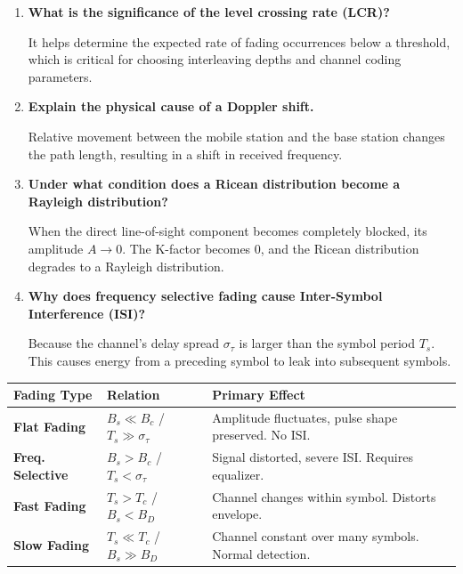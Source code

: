 \documentclass[12pt,a4paper]{article}
\newcommand{\Q}[1]{\textbf{#1}\par\noindent\ignorespaces}
\renewcommand{\arraystretch}{1.45}
\begin{document}
\begin{tcolorbox}[exambox, title={\textbf{Frequently Asked / Viva Questions}}]
\begin{enumerate}[topsep=0pt, label=\textbf{Q\arabic*.}, itemsep=5pt]
  \item \Q{What is the significance of the level crossing rate (LCR)?}
    It helps determine the expected rate of fading occurrences below a threshold, which is critical for choosing interleaving depths and channel coding parameters.
  \item \Q{Explain the physical cause of a Doppler shift.}
    Relative movement between the mobile station and the base station changes the path length, resulting in a shift in received frequency.
  \item \Q{Under what condition does a Ricean distribution become a Rayleigh distribution?}
    When the direct line-of-sight component becomes completely blocked, its amplitude $A \to 0$. The K-factor becomes 0, and the Ricean distribution degrades to a Rayleigh distribution.
  \item \Q{Why does frequency selective fading cause Inter-Symbol Interference (ISI)?}
    Because the channel's delay spread $\sigma_\tau$ is larger than the symbol period $T_s$. This causes energy from a preceding symbol to leak into subsequent symbols.
\end{enumerate}
\end{tcolorbox}

\begin{tcolorbox}[tikzbox, title={Fading Types Summary Table}]
\renewcommand{\arraystretch}{1.4}
\par\noindent
{\renewcommand{\arraystretch}{1.65}%
\begin{tabularx}{\linewidth}{|B{3.0cm}|Y|Y|}\hline
\textbf{Fading Type} & \textbf{Relation} & \textbf{Primary Effect} \\
\hline
\textbf{Flat Fading} & $B_s \ll B_c$ \;/\; $T_s \gg \sigma_\tau$ & Amplitude fluctuates, pulse shape preserved. No ISI. \\[4pt]
\hline
\textbf{Freq. Selective} & $B_s > B_c$ \;/\; $T_s < \sigma_\tau$ & Signal distorted, severe ISI. Requires equalizer. \\[4pt]
\hline
\textbf{Fast Fading} & $T_s > T_c$ \;/\; $B_s < B_D$ & Channel changes within symbol. Distorts envelope. \\[4pt]
\hline
\textbf{Slow Fading} & $T_s \ll T_c$ \;/\; $B_s \gg B_D$ & Channel constant over many symbols. Normal detection. \\[4pt]
\hline
\end{tabularx}
}
\end{tcolorbox}
\end{document}
